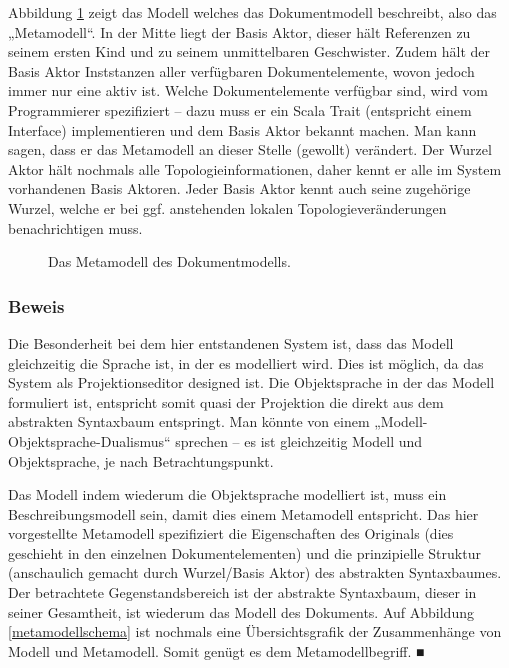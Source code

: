 Abbildung \ref{metamodell} zeigt das Modell welches das Dokumentmodell beschreibt, also das „Metamodell“. In der Mitte liegt der Basis Aktor, dieser hält Referenzen zu seinem ersten Kind und zu seinem unmittelbaren Geschwister. Zudem hält der Basis Aktor Inststanzen aller verfügbaren Dokumentelemente, wovon jedoch immer nur eine aktiv ist. Welche Dokumentelemente verfügbar sind, wird vom Programmierer spezifiziert -- dazu muss er ein Scala Trait (entspricht einem Interface) implementieren und dem Basis Aktor bekannt machen. Man kann sagen, dass er das Metamodell an dieser Stelle (gewollt) verändert. Der Wurzel Aktor hält nochmals alle Topologieinformationen, daher kennt er alle im System vorhandenen Basis Aktoren. Jeder Basis Aktor kennt auch seine zugehörige Wurzel, welche er bei ggf. anstehenden lokalen Topologieveränderungen benachrichtigen muss.

 
\begin{figure}[h!]
\centering
\advance\leftskip-2.5cm
\caption[Metamodell des Dokumentmodells]{ Das Metamodell des Dokumentmodells. }\label{metamodell}
\end{figure}
 
\subsubsection{Beweis}\label{}

 
Die Besonderheit bei dem hier entstandenen System ist, dass das Modell gleichzeitig die Sprache ist, in der es modelliert wird. Dies ist möglich, da das System als Projektionseditor designed ist. Die Objektsprache in der das Modell formuliert ist, entspricht somit quasi der Projektion die direkt aus dem abstrakten Syntaxbaum entspringt. Man könnte von einem „Modell-Objektsprache-Dualismus“ sprechen -- es ist gleichzeitig Modell und Objektsprache, je nach Betrachtungspunkt.

 
Das Modell indem wiederum die Objektsprache modelliert ist, muss ein Beschreibungsmodell sein, damit dies einem Metamodell entspricht. Das hier vorgestellte Metamodell spezifiziert die Eigenschaften des Originals (dies geschieht in den einzelnen Dokumentelementen) und die prinzipielle Struktur (anschaulich gemacht durch Wurzel/Basis Aktor) des abstrakten Syntaxbaumes. Der betrachtete Gegenstandsbereich ist der abstrakte Syntaxbaum, dieser in seiner Gesamtheit, ist wiederum das Modell des Dokuments. Auf Abbildung \ref{metamodellschema} ist nochmals eine Übersichtsgrafik der Zusammenhänge von Modell und Metamodell. Somit genügt es dem Metamodellbegriff. ■

